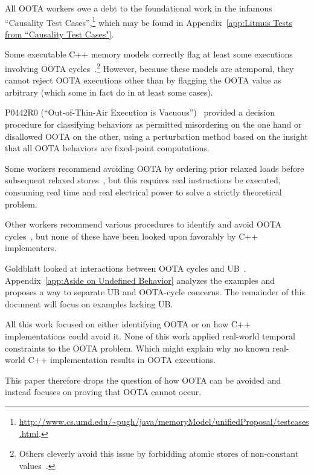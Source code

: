 \documentclass[10]{article}
\begin{document}
All OOTA workers owe a debt to the foundational work in the infamous
``Causality Test Cases'',\footnote{
	\url{http://www.cs.umd.edu/~pugh/java/memoryModel/unifiedProposal/testcases.html}.}
which may be found in
Appendix~\ref{app:Litmus Tests from “Causality Test Cases"}.

Some executable C++ memory models correctly flag at least some executions
involving OOTA cycles~\cite{JadeAlglave2014HerdingCats}.\footnote{
	Others cleverly avoid this issue by forbidding atomic
	stores of non-constant values~\cite{MarkBatty2011cppmem}.}
However, because these models are atemporal, they cannot reject
OOTA executions other than by flagging the OOTA value as arbitrary
(which some in fact do in at least some cases).

P0442R0 (``Out-of-Thin-Air Execution is Vacuous'')~\cite{PaulEMcKenney2016OOTA}
provided a decision procedure for classifying behaviors as permitted
misordering on the one hand or disallowed OOTA on the other, using
a perturbation method based on the insight that all OOTA behaviors are
fixed-point computations.

Some workers recommend avoiding OOTA by ordering prior relaxed
loads before subsequent relaxed
stores~\cite{Boehm:2014:OGA:2618128.2618134,HansBoehm2019OOTArevisitedAgain,Lahav:2017:RSC:3062341.3062352},
but this requires real instructions be executed, consuming real
time and real electrical power to solve a strictly theoretical
problem.

Other workers recommend various procedures to identify and avoid OOTA
cycles~\cite{Lahav:2017:RSC:3062341.3062352,Sinclair:2017:CAR:3079856.3080206,Lee:10.1145/3385412.3386010,MarkBatty2019ModularRelaxedDependenciesOOTA},
but none of these have been looked upon favorably by C++ implementers.

Goldblatt looked at interactions between OOTA cycles and
UB~\cite{DavidGoldblatt2019NoElegantOOTAfix}.
Appendix~\ref{app:Aside on Undefined Behavior}
analyzes the examples and proposes a way to separate UB and OOTA-cycle
concerns.
The remainder of this document will focus on examples lacking UB.

All this work focused on either identifying OOTA or on how C++
implementations could avoid it.
None of this work applied real-world temporal constraints to the OOTA
problem.
Which might explain why no known real-world C++ implementation results
in OOTA executions.

This paper therefore drops the question of how OOTA can be avoided and
instead focuses on proving that OOTA cannot occur.
\end{document}
